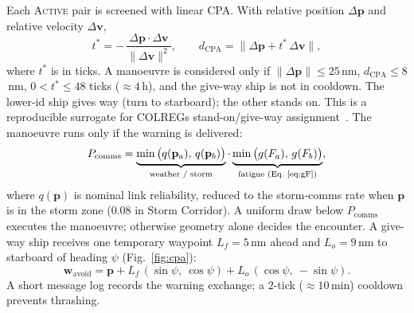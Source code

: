 \documentclass[cameraready]{Interspeech}
\begin{document}
Each \textsc{Active} pair is screened with linear CPA. With relative position $\Delta\mathbf{p}$ and relative velocity $\Delta\mathbf{v}$,
\begin{equation*}
  t^\ast = -\,\frac{\Delta\mathbf{p}\cdot\Delta\mathbf{v}}{\lVert\Delta\mathbf{v}\rVert^2},
  \qquad
  d_{\text{CPA}} = \big\lVert \Delta\mathbf{p} + t^\ast\,\Delta\mathbf{v} \big\rVert,
\end{equation*}
where $t^\ast$ is in ticks. A manoeuvre is considered only if $\lVert\Delta\mathbf{p}\rVert \le 25$\,nm, $d_{\text{CPA}} \le 8$\,nm, $0 < t^\ast \le 48$ ticks (${\approx}4$\,h), and the give-way ship is not in cooldown. The lower-id ship gives way (turn to starboard); the other stands on. This is a reproducible surrogate for COLREGs stand-on/give-way assignment~\cite{colregs1972,tam2010}. The manoeuvre runs only if the warning is delivered:
\begin{equation}
  P_{\text{comms}} = \underbrace{\min\big(q(\mathbf{p}_a),\,q(\mathbf{p}_b)\big)}_{\text{weather / storm}}
  \cdot
  \underbrace{\min\big(g(F_a),\,g(F_b)\big)}_{\text{fatigue (Eq.~\ref{eq:gF})}},
  \label{eq:pcomms}
\end{equation}
\vspace{0.6em}
\noindent where $q(\mathbf{p})$ is nominal link reliability, reduced to the storm-comms rate when $\mathbf{p}$ is in the storm zone ($0.08$ in Storm Corridor). A uniform draw below $P_{\text{comms}}$ executes the manoeuvre; otherwise geometry alone decides the encounter. A give-way ship receives one temporary waypoint $L_f = 5$\,nm ahead and $L_o = 9$\,nm to starboard of heading $\psi$ (Fig.~\ref{fig:cpa}):
\begin{equation}
  \mathbf{w}_{\text{avoid}} = \mathbf{p} + L_f\,(\sin\psi,\ \cos\psi) + L_o\,(\cos\psi,\ -\sin\psi).
  \label{eq:avoidwp}
\end{equation}
A short message log records the warning exchange; a $2$-tick (${\approx}10$\,min) cooldown prevents thrashing.
\end{document}
